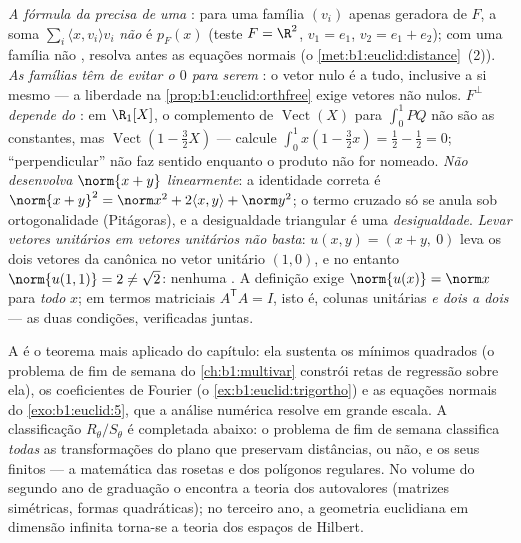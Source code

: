 \begin{remark}
\label{rem:b1:euclid:pitfalls}
\emph{A fórmula da  precisa de uma  }: para
uma família $(v_i)$ apenas geradora de $F$, a soma $\sum_i\langle
x, v_i\rangle v_i$ \emph{não}
é $p_F(x)$ (teste $F = \R^2$, $v_1
= e_1$, $v_2 = e_1 + e_2$); com uma família não
, resolva antes as equações normais (o \cref{met:b1:euclid:distance}~(2)).
\emph{As famílias  têm de evitar o $0$ para serem }:
o vetor nulo é  a tudo, inclusive a si mesmo --- a
liberdade na \cref{prop:b1:euclid:orthfree} exige vetores não nulos.
\emph{$F^\perp$ depende do }: em $\R_1[X]$, o
complemento de $\operatorname{Vect}(X)$ para $\int_0^1 PQ$ não são as constantes, mas $\operatorname{Vect}(1 - \frac32 X)$
--- calcule $\int_0^1 x(1 - \frac32 x) = \frac12 - \frac12 = 0$; ``perpendicular'' não faz sentido enquanto o
produto não for nomeado.
\emph{Não desenvolva $\norm{x + y}$ linearmente}: a identidade correta é
$\norm{x+y}^2 = \norm x^2 + 2\langle x, y\rangle +
\norm y^2$; o termo cruzado só se anula sob ortogonalidade (Pitágoras),
e a desigualdade triangular é uma \emph{desigualdade}.
\emph{Levar vetores unitários em vetores unitários não basta}:
$u(x,
y) = (x + y,\ 0)$ leva os dois vetores da  canônica no vetor unitário
$(1, 0)$, e no entanto $\norm{u(1,1)} = 2 \neq \sqrt2$: nenhuma . A definição exige
$\norm{u(x)} = \norm x$ para \emph{todo} $x$; em termos matriciais $A^{\mathsf T}A = I$, isto é,
colunas unitárias \emph{e dois a dois } --- as duas
condições, verificadas juntas.
\end{remark}

\begin{remark}
\label{rem:b1:euclid:whereused}
A  é o teorema mais aplicado do capítulo: ela
sustenta os mínimos quadrados (o problema de fim de semana do \cref{ch:b1:multivar}
constrói retas de regressão sobre ela), os coeficientes de Fourier
(o \cref{ex:b1:euclid:trigortho}) e as equações normais do \cref{exo:b1:euclid:5}, que a análise numérica
resolve em grande escala. A classificação $R_\theta / S_\theta$ é completada abaixo:
o problema de fim de semana classifica \emph{todas} as
transformações do plano que preservam distâncias,  ou não, e
os seus  finitos --- a matemática das rosetas e dos polígonos
regulares. No volume do segundo ano de graduação o 
encontra a teoria dos autovalores (matrizes simétricas, formas
quadráticas); no terceiro ano, a geometria euclidiana em dimensão
infinita torna-se a teoria dos espaços de Hilbert.
\end{remark}

